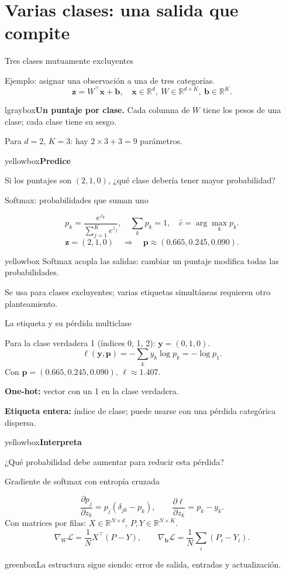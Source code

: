 \documentclass[10pt,aspectratio=169,xcolor={dvipsnames}]{beamer}
\newenvironment{caja}[1][lgraybox]{\begin{beamercolorbox}[sep=0.7em,wd=\linewidth]{#1}}{\end{beamercolorbox}}
\newcommand{\actividad}[2]{\begin{caja}[yellowbox]\textbf{#1}\par\smallskip #2\end{caja}}
\newcommand{\R}{\mathbb{R}}
\begin{document}
\section{Varias clases: una salida que compite}
\begin{frame}{Tres clases mutuamente excluyentes}

Ejemplo: asignar una observación a una de tres categorías.
\[\bm z=W^\top\bm x+\bm b,\quad
\bm x\in\R^d,\ W\in\R^{d\times K},\ \bm b\in\R^K.\]
\begin{caja}\textbf{Un puntaje por clase.}
Cada columna de $W$ tiene los pesos de una clase; cada clase tiene su sesgo.\end{caja}
Para $d=2$, $K=3$: hay $2\times3+3=9$ parámetros.
\actividad{Predice}{Si los puntajes son $(2,1,0)$, ¿qué clase debería tener mayor probabilidad?}
\note{}
\end{frame}

\begin{frame}{Softmax: probabilidades que suman uno}

\[p_k=\frac{e^{z_k}}{\sum_{j=1}^K e^{z_j}},\quad
\sum_kp_k=1,\quad\hat c=\arg\max_kp_k.\]
\[\bm z=(2,1,0)\quad\Longrightarrow\quad
\bm p\approx(0.665,0.245,0.090).\]
\begin{caja}[yellowbox]
Softmax acopla las salidas: cambiar un puntaje modifica todas las probabilidades.
\end{caja}
Se usa para clases excluyentes; varias etiquetas simultáneas requieren otro planteamiento.
\note{}
\end{frame}

\begin{frame}{La etiqueta y su pérdida multiclase}

Para la clase verdadera 1 (índices 0, 1, 2): $\bm y=(0,1,0)$.
\[\ell(\bm y,\bm p)=-\sum_k y_k\log p_k=-\log p_1.\]
Con $\bm p=(0.665,0.245,0.090)$, $\ell\approx1.407$.
\par\bigskip
\textbf{One-hot:} vector con un 1 en la clase verdadera.
\par\medskip
\textbf{Etiqueta entera:} índice de clase; puede usarse con una pérdida categórica dispersa.
\actividad{Interpreta}{¿Qué probabilidad debe aumentar para reducir esta pérdida?}
\note{}
\end{frame}

\begin{frame}{Gradiente de softmax con entropía cruzada}

\[\frac{\partial p_j}{\partial z_k}=p_j(\delta_{jk}-p_k),
\qquad \frac{\partial\ell}{\partial z_k}=p_k-y_k.\]
Con matrices por filas: $X\in\R^{N\times d}$, $P,Y\in\R^{N\times K}$.
\[\nabla_W\mathcal L=\frac1N X^\top(P-Y),\qquad
\nabla_{\bm b}\mathcal L=\frac1N\sum_i(P_i-Y_i).\]
\begin{caja}[greenbox]La estructura sigue siendo: error de salida, entradas y actualización.\end{caja}
\end{frame}
\end{document}
